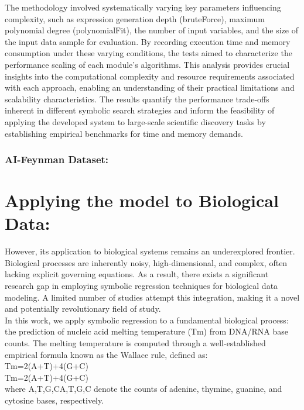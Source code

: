 \documentclass{article}
\begin{document}
The methodology involved systematically varying key parameters influencing complexity, such as expression generation depth (bruteForce), maximum polynomial degree (polynomialFit), the number of input variables, and the size of the input data sample for evaluation. By recording execution time and memory consumption under these varying conditions, the tests aimed to characterize the performance scaling of each module's algorithms. This analysis provides crucial insights into the computational complexity and resource requirements associated with each approach, enabling an understanding of their practical limitations and scalability characteristics. The results quantify the performance trade-offs inherent in different symbolic search strategies and inform the feasibility of applying the developed system to large-scale scientific discovery tasks by establishing empirical benchmarks for time and memory demands.\\


\subsubsection{AI-Feynman Dataset: }


\section{ Applying the model to Biological Data: }

However, its application to biological systems remains an underexplored frontier. Biological processes are inherently noisy, high-dimensional, and complex, often lacking explicit governing equations. As a result, there exists a significant research gap in employing symbolic regression techniques for biological data modeling. A limited number of studies attempt this integration, making it a novel and potentially revolutionary field of study.\\

In this work, we apply symbolic regression to a fundamental biological process: the prediction of nucleic acid melting temperature (Tm) from DNA/RNA base counts. The melting temperature is computed through a well-established empirical formula known as the Wallace rule, defined as:\\
Tm=2(A+T)+4(G+C)\\
Tm=2(A+T)+4(G+C)\\

where A,T,G,CA,T,G,C denote the counts of adenine, thymine, guanine, and cytosine bases, respectively.\\
\end{document}
